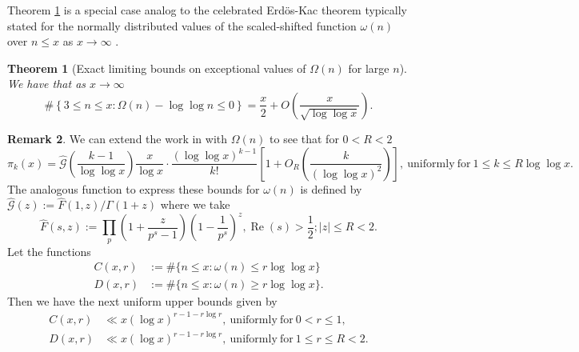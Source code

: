 \documentclass[11pt,reqno,a4letter]{article}
\numberwithin{figure}{section}
\numberwithin{table}{section}
\newcommand{\cf}{\textit{cf.\ }}
\theoremstyle{plain}
\newtheorem{theorem}{Theorem}
\numberwithin{theorem}{section}
\theoremstyle{definition}
\newtheorem{remark}[theorem]{Remark}
\renewcommand{\Re}{\operatorname{Re}}
\begin{document}
Theorem \ref{theorem_MV_Thm7.21-init_stmt} is a special case analog to the 
celebrated Erd\"os-Kac theorem typically stated for the 
normally distributed values of the scaled-shifted function $\omega(n)$ over $n \leq x$ as 
$x \rightarrow \infty$ \cite[\cf Thm.\ 7.21]{MV}. 

\begin{theorem}[Exact limiting bounds on exceptional values of $\Omega(n)$ for large $n$] 
\label{theorem_MV_Thm7.21-init_stmt} 
We have that as $x \rightarrow \infty$ 
\[
\#\left\{3 \leq n \leq x: \Omega(n) - \log\log n \leq 0\right\} = 
     \frac{x}{2} + O\left(\frac{x}{\sqrt{\log\log x}}\right). 
\]
\end{theorem} 

\begin{remark} 
We can extend the work in \cite{MV} with $\Omega(n)$ to see that 
for $0 < R < 2$ 
\[
\pi_k(x) = \widehat{\mathcal{G}}\left(\frac{k-1}{\log\log x}\right) 
     \frac{x}{\log x} \cdot \frac{(\log\log x)^{k-1}}{k!} \left[ 
     1 + O_R\left(\frac{k}{(\log\log x)^2}\right) 
     \right], 
     \mathrm{\ uniformly\ for\ } 1 \leq k \leq R\log\log x. 
\]
The analogous function to express these bounds for $\omega(n)$ is 
defined by $\widehat{\mathcal{G}}(z) := \widehat{F}(1, z) / \Gamma(1 + z)$ where 
we take 
\[
\widehat{F}(s, z) := \prod_p \left(1 + \frac{z}{p^s-1}\right) \left(1 - \frac{1}{p^s}\right)^{z}, 
     \Re(s) > \frac{1}{2}; |z| \leq R < 2. 
\]
Let the functions 
\begin{align*} 
C(x, r) & := \#\{n \leq x: \omega(n) \leq r \log\log x\} \\ 
D(x, r) & := \#\{n \leq x: \omega(n) \geq r \log\log x\}. 
\end{align*} 
Then we have the next uniform upper bounds given by 
\begin{align*} 
C(x, r) & \ll x (\log x)^{r - 1 - r \log r}, \mathrm{\ uniformly\ for\ } 0 < r \leq 1, \\ 
D(x, r) & \ll x (\log x)^{r - 1 - r \log r}, \mathrm{\ uniformly\ for\ } 1 \leq r \leq R < 2.
\end{align*} 
\end{remark} 
\end{document}

